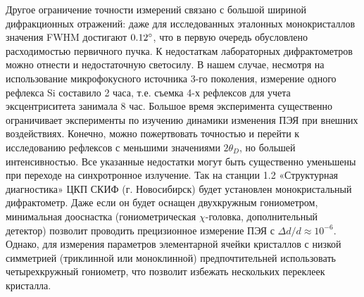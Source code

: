 Другое ограничение точности измерений связано с большой шириной дифракционных отражений: даже для исследованных эталонных монокристаллов значения FWHM достигают $0.12^\circ$, что в первую очередь обусловлено расходимостью первичного пучка.
К недостаткам лабораторных дифрактометров можно отнести и недостаточную светосилу.
В нашем случае, несмотря на использование микрофокусного источника 3-го поколения, измерение одного рефлекса Si составило 2 часа, т.е. съемка 4-х рефлексов для учета эксцентриситета занимала 8 час.
Большое время эксперимента существенно ограничивает эксперименты по изучению динамики изменения ПЭЯ при внешних воздействиях.
Конечно, можно пожертвовать точностью и перейти к исследованию рефлексов с меньшими значениями $2\theta_D$, но большей интенсивностью.
Все указанные недостатки могут быть существенно уменьшены при переходе на синхротронное излучение.
Так на станции 1.2 «Структурная диагностика» ЦКП СКИФ (г. Новосибирск) будет установлен монокристальный дифрактометр.
Даже если он будет оснащен двухкружным гониометром, минимальная дооснастка (гониометрическая $\chi$-головка, дополнительный детектор) позволит проводить прецизионное измерение ПЭЯ с $\Delta d / d \approx 10^{-6}$.
Однако, для измерения параметров элементарной ячейки кристаллов с низкой симметрией (триклинной или моноклинной) предпочтительней использовать четырехкружный гониометр, что позволит избежать нескольких переклеек кристалла.
